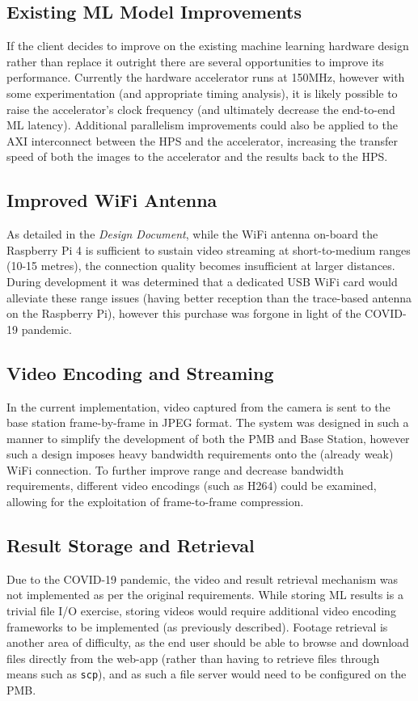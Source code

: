 \documentclass[10pt,letterpaper]{article}
\begin{document}
\subsection{Existing ML Model Improvements}
If the client decides to improve on the existing machine learning hardware design rather than replace it outright there are several opportunities to improve its performance. Currently the hardware accelerator runs at 150MHz, however with some experimentation (and appropriate timing analysis), it is likely possible to raise the accelerator's clock frequency (and ultimately decrease the end-to-end ML latency). Additional parallelism improvements could also be applied to the AXI interconnect between the HPS and the accelerator, increasing the transfer speed of both the images to the accelerator and the results back to the HPS.

\subsection{Improved WiFi Antenna}
As detailed in the \textit{Design Document}, while the WiFi antenna on-board the Raspberry Pi 4 is sufficient to sustain video streaming at short-to-medium ranges (10-15 metres), the connection quality becomes insufficient at larger distances. During development it was determined that a dedicated USB WiFi card would alleviate these range issues (having better reception than the trace-based antenna on the Raspberry Pi), however this purchase was forgone in light of the COVID-19 pandemic. 

\subsection{Video Encoding and Streaming}
In the current implementation, video captured from the camera is sent to the base station frame-by-frame in JPEG format. The system was designed in such a manner to simplify the development of both the PMB and Base Station, however such a design imposes heavy bandwidth requirements onto the (already weak) WiFi connection. To further improve range and decrease bandwidth requirements, different video encodings (such as H264) could be examined, allowing for the exploitation of frame-to-frame compression.

\subsection{Result Storage and Retrieval}
Due to the COVID-19 pandemic, the video and result retrieval mechanism was not implemented as per the original requirements. While storing ML results is a trivial file I/O exercise, storing videos would require additional video encoding frameworks to be implemented (as previously described). Footage retrieval is another area of difficulty, as the end user should be able to browse and download files directly from the web-app (rather than having to retrieve files through means such as \texttt{scp}), and as such a file server would need to be configured on the PMB.  

\clearpage
{}



\end{document}
